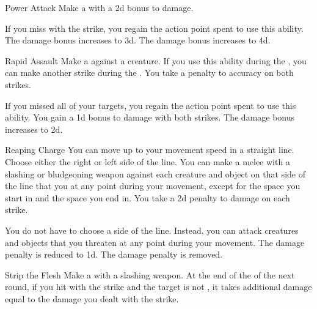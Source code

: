 {            \begin{ability}{Power Attack}
                Make a  with a \plus2d bonus to damage.

                \rankline
                 If you miss with the strike, you regain the action point spent to use this ability.
                 The damage bonus increases to \plus3d.
                 The damage bonus increases to \plus4d.
            \end{ability}

            \begin{ability}{Rapid Assault}
                Make a  against a creature.
                If you use this ability during the , you can make another strike during the .
                You take a  penalty to accuracy on both strikes.

                \rankline
                 If you missed all of your targets, you regain the action point spent to use this ability.
                 You gain a \plus1d bonus to damage with both strikes.
                 The damage bonus increases to \plus2d.
            \end{ability}

            \begin{ability}{Reaping Charge}
                You can move up to your movement speed in a straight line.
                Choose either the right or left side of the line.
                You can make a melee  with a slashing or bludgeoning weapon against each creature and object on that side of the line that you  at any point during your movement, except for the space you start in and the space you end in.
                You take a \minus2d penalty to damage on each strike.

                \rankline
                 You do not have to choose a side of the line.
                Instead, you can attack creatures and objects that you threaten at any point during your movement.
                 The damage penalty is reduced to \minus1d.
                 The damage penalty is removed.
            \end{ability}

            \begin{ability}{Strip the Flesh}
                Make a  with a slashing weapon.
                At the end of the  of the next round, if you hit with the strike and the target is not , it takes additional damage equal to the damage you dealt with the strike.


\end{ability}}
